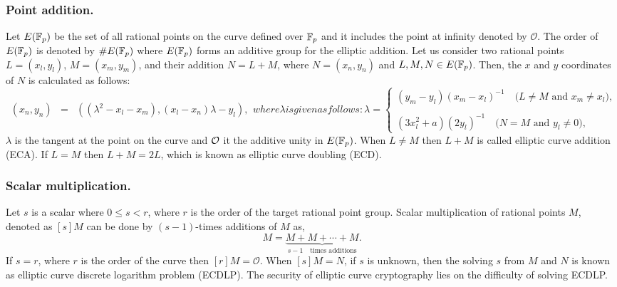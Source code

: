 \subsubsection{Point addition.}
Let $E({\mathbb{F}}_{p})$ be the set of all rational points on the curve defined over ${\mathbb{F}}_{p}$ and it includes the point at infinity denoted by $\mathcal{O}$.
The order of $E(\mathbb{F}_p)$ is denoted by $\#E(\mathbb{F}_p)$ where $E(\mathbb{F}_p)$ forms an additive group for the elliptic addition.
Let us consider two rational points $L = (x_l, y_l)$, $M = (x_m, y_m)$, and their addition $N = L + M$, where $\textit{N} = (x_n, y_n)$ and $L, M, N\in E({\mathbb{F}}_{p})$. Then, the $x$ and $y$ coordinates of $N$ is calculated as follows:
\begin{subequations}
\begin{eqnarray}\label{eq:point_add}
(x_n ,y_n) & = & ((\lambda^2-x_l-x_m ),  (x_l-x_n)\lambda - y_l), 
\end{eqnarray}
where \mbox{$\lambda$} is given as follows:
\begin{equation}\label{eq:point_solpe}
\textstyle \lambda = 
\begin{cases}
 \textstyle (y_m - y_l)(x_m -x_l)^{-1} \quad \mbox{($L \neq M$ and $x_m \neq x_l$)},\\\\
 \textstyle  (3x_l^2+a)(2y_l)^{-1} \quad  \mbox{($N = M$ and $y_l\neq 0$)} ,
\end{cases}
\end{equation}
\end{subequations}
$\lambda$ is the tangent at the point on the curve and $\cal O$ it the additive unity in $E({\mathbb{F}}_{p})$. When $L \neq M$ then $L+M$ is called elliptic curve addition (ECA). If $L=M$ then $L+M=2L$, which is known as elliptic curve doubling (ECD). 
\subsubsection{Scalar multiplication.}
Let $s$ is a scalar where $0 \leq s < r$, where $r$ is the order of the target rational point group. Scalar multiplication of rational points $M$, denoted as $[s]M$ can be done by $(s-1)$-times additions of $M$ as,
\begin{equation}
[s]M = \underbrace{M+M+ \cdots +M}_{s-1 \quad \mbox{times additions}}.
\end{equation}
If $s = r$, where $r$ is the order of the curve then $[r]M = \mathcal{O}$. When $[s]M = N$, if $s$ is unknown, then the solving $s$ from $M$ and $N$ is known as elliptic curve discrete logarithm problem (ECDLP). The security of elliptic curve cryptography lies on the difficulty of solving ECDLP.


